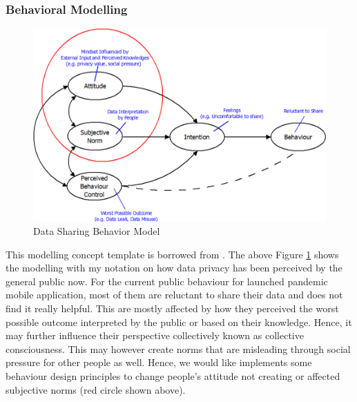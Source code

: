     \subsubsection{Behavioral Modelling}
      \begin{figure}[H]
        \centering
        \includegraphics[scale=1]{img/digital-prototype/behavior-model.png}
        \caption{Data Sharing Behavior Model}
        \label{fig:behavior-model}
      \end{figure}
      \par This modelling concept template is borrowed from \parencite{Ian8}. The above Figure \ref{fig:behavior-model} shows the modelling with my notation on how data privacy has been perceived by the general public now. For the current public behaviour for launched pandemic mobile application, most of them are reluctant to share their data and does not find it really helpful. This are mostly affected by how they perceived the worst possible outcome interpreted by the public or based on their knowledge. Hence, it may further influence their perspective collectively known as collective consciousness. This may however create norms that are misleading through social pressure for other people as well. Hence, we would like implements some behaviour design principles to change people’s attitude not creating or affected subjective norms (red circle shown above).
    
